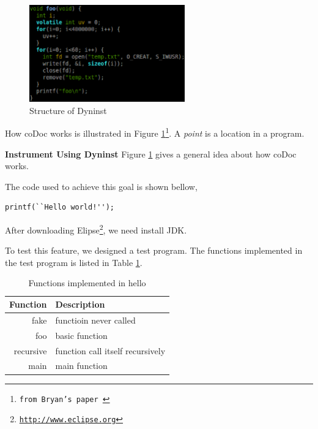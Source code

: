 \documentclass[11pt,letterpaper,oneside]{article}
\begin{document}
\begin{figure}
\begin{center}
\includegraphics[width=0.6\textwidth]{codoc.eps}
\caption{Structure of Dyninst}
\label{fig:codoc}
\end{center}
\end{figure}

How coDoc works is illustrated in Figure \ref{fig:codoc}\footnote{\texttt{from Bryan's paper \cite{xiao_automated_2012}}}. 
A \emph{point} is a location in a program.

\noindent \newline\textbf{Instrument Using Dyninst}\newline
\indent Figure \ref{fig:codoc} gives a general idea about how coDoc works.

The code used to achieve this goal is shown bellow,
\begin{Verbatim}[frame=single]
printf(``Hello world!'');
\end{Verbatim}


After downloading Elipse\footnote{\texttt{\url{http://www.eclipse.org}}}, we need install JDK.

To test this feature, we designed a test program. 
The functions implemented in the test program is listed in Table \ref{table:functions}.

\begin{table}[th]
\caption{Functions implemented in hello}
\centering
\begin{tabular}{rl}
\hline
Function & Description \\
\hline
fake & functioin never called \\
foo  & basic function \\
recursive & function call itself recursively \\
main & main function \\
\hline
\end{tabular}
\label{table:functions}
\end{table}
\end{document}
